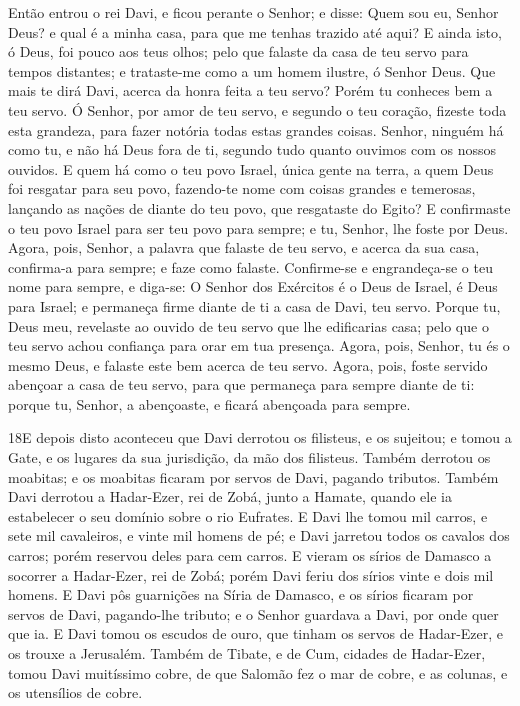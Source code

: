Então entrou o rei Davi, e ficou perante o Senhor; e disse: Quem
sou eu, Senhor Deus? e qual é a minha casa, para que me tenhas
trazido até aqui? E ainda isto, ó Deus, foi pouco aos teus
olhos; pelo que falaste da casa de teu servo para tempos distantes;
e trataste-me como a um homem ilustre, ó Senhor Deus. Que
mais te dirá Davi, acerca da honra feita a teu servo? Porém tu
conheces bem a teu servo. Ó Senhor, por amor de teu servo, e
segundo o teu coração, fizeste toda esta grandeza, para fazer
notória todas estas grandes coisas. Senhor, ninguém há como
tu, e não há Deus fora de ti, segundo tudo quanto ouvimos com os
nossos ouvidos. E quem há como o teu povo Israel, única gente
na terra, a quem Deus foi resgatar para seu povo, fazendo-te nome
com coisas grandes e temerosas, lançando as nações de diante do teu
povo, que resgataste do Egito? E confirmaste o teu povo
Israel para ser teu povo para sempre; e tu, Senhor, lhe foste por
Deus. Agora, pois, Senhor, a palavra que falaste de teu
servo, e acerca da sua casa, confirma-a para sempre; e faze como
falaste. Confirme-se e engrandeça-se o teu nome para sempre,
e diga-se: O Senhor dos Exércitos é o Deus de Israel, é Deus para
Israel; e permaneça firme diante de ti a casa de Davi, teu servo.
Porque tu, Deus meu, revelaste ao ouvido de teu servo que lhe
edificarias casa; pelo que o teu servo achou confiança para orar em
tua presença. Agora, pois, Senhor, tu és o mesmo Deus, e
falaste este bem acerca de teu servo. Agora, pois, foste
servido abençoar a casa de teu servo, para que permaneça para sempre
diante de ti: porque tu, Senhor, a abençoaste, e ficará abençoada
para sempre.

\medskip

\lettrine{18} E depois disto aconteceu que Davi derrotou os
filisteus, e os sujeitou; e tomou a Gate, e os lugares da sua
jurisdição, da mão dos filisteus. Também derrotou os moabitas; e
os moabitas ficaram por servos de Davi, pagando tributos. Também
Davi derrotou a Hadar-Ezer, rei de Zobá, junto a Hamate, quando ele
ia estabelecer o seu domínio sobre o rio Eufrates. E Davi lhe
tomou mil carros, e sete mil cavaleiros, e vinte mil homens de pé; e
Davi jarretou todos os cavalos dos carros; porém reservou deles para
cem carros. E vieram os sírios de Damasco a socorrer a
Hadar-Ezer, rei de Zobá; porém Davi feriu dos sírios vinte e dois
mil homens. E Davi pôs guarnições na Síria de Damasco, e os
sírios ficaram por servos de Davi, pagando-lhe tributo; e o Senhor
guardava a Davi, por onde quer que ia. E Davi tomou os escudos
de ouro, que tinham os servos de Hadar-Ezer, e os trouxe a
Jerusalém. Também de Tibate, e de Cum, cidades de Hadar-Ezer,
tomou Davi muitíssimo cobre, de que Salomão fez o mar de cobre, e as
colunas, e os utensílios de cobre.

